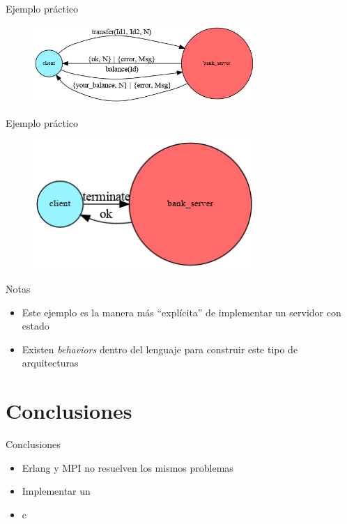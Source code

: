 \documentclass{beamer}
\begin{document}
    \begin{frame}{Ejemplo práctico}
      \begin{figure}
        \includegraphics[width=0.75\textwidth]{transfer-balance.dot.png}
      \end{figure}
    \end{frame}

    \begin{frame}{Ejemplo práctico}
      \begin{figure}
        \includegraphics[width=0.75\textwidth]{terminate.dot.png}
      \end{figure}
    \end{frame}

    \begin{frame}{Notas}
      \begin{itemize}
        \item Este ejemplo es la manera más ``explícita'' de implementar
        un servidor con estado
        \item Existen \textit{behaviors} dentro del lenguaje para construir
        este tipo de arquitecturas
      \end{itemize}
    \end{frame}

  \section{Conclusiones}
    \begin{frame}{Conclusiones}
      \begin{itemize}
        \item Erlang y MPI no resuelven los mismos problemas
        \item Implementar un
        \item c
      \end{itemize}
    \end{frame}
\end{document}
